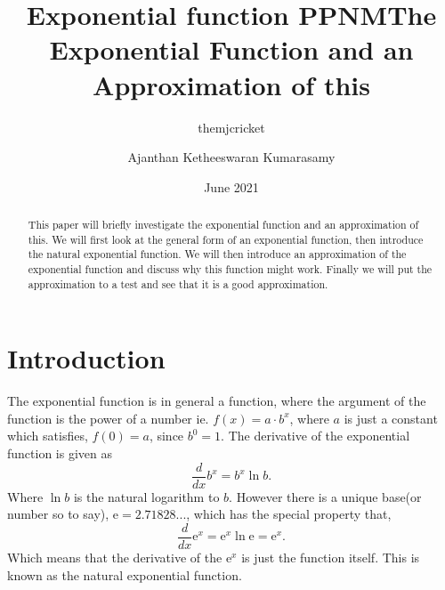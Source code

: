 \documentclass[12pt,a4paper,oneside]{article}
\title{Exponential function PPNM}
\author{themjcricket }
\date{June 2021}
\title{The Exponential Function and an Approximation of this}
\author{Ajanthan Ketheeswaran Kumarasamy}
\begin{document}
\maketitle

\begin{abstract}
  This paper will briefly investigate the exponential function and an approximation of this. We will first look at the general form of an exponential function, then introduce the natural exponential function. We will then introduce an approximation of the exponential function and discuss why this function might work. Finally we will put the approximation to a test and see that it is a good approximation.
\end{abstract}
\section{Introduction}
The exponential	function is in general a function, where the argument of the function is the power of a	number ie. $f(x)=a \cdot b^{x}$, where $a$ is just a constant which satisfies, $f(0)=a$, since $b^{0}=1$. The derivative of the exponential function is given as
\begin{equation}
    \frac{d}{d x}b^{x} = b^{x} \ln{b}.
\end{equation}
Where $\ln{b}$ is the natural logarithm to $b$. However there is a unique base(or number so to say), $\text{e}=2.71828...$, which has the special property that,
\begin{equation}
    \frac{d}{d x}\text{e}^{x} = \text{e}^{x} \ln{\text{e}}= \text{e}^{x}.
\end{equation}
Which means that the derivative of the $\text{e}^{x}$ is just the function itself. This is known as the natural exponential function.
\end{document}
